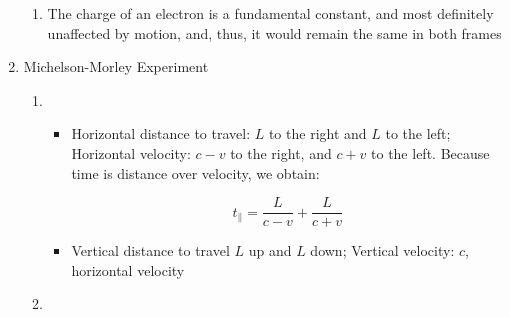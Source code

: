 \begin{enumerate}
\begin{enumerate}
      \item The charge of an electron is a fundamental constant, and most definitely unaffected by motion, and, thus, it would remain the same in both frames

    \end{enumerate}
    
  \item Michelson-Morley Experiment

    \begin{enumerate}

      \item 

        \begin{itemize}

          \item Horizontal distance to travel: $L$ to the right and $L$ to the left; Horizontal velocity: $c-v$ to the right, and $c+v$ to the left. Because time is distance over velocity, we obtain:

            $$t_{\parallel}=\frac{L}{c-v}+\frac{L}{c+v}$$

          \item Vertical distance to travel $L$ up and $L$ down; Vertical velocity: $c$, horizontal velocity

        \end{itemize}

      \item

    \end{enumerate}

\end{enumerate}



